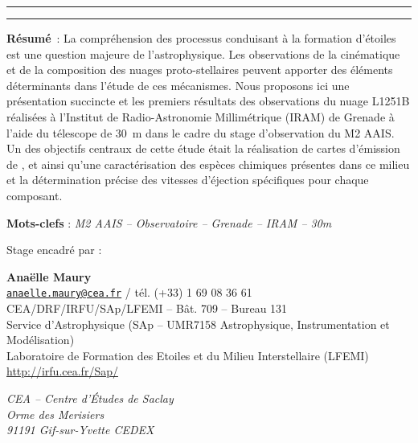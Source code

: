 \documentclass[a4paper,10pt,french]{article}
\begin{document}
\begin{center}

    \vspace{1.5cm}

    \rule[11pt]{5cm}{0.5pt}

    \textbf{\huge \thetitle}

    \rule{5cm}{0.5pt}

    \vspace{1.5cm}

    \parbox{15cm}{\textbf{Résumé} :
        La compréhension des processus conduisant à la formation d’étoiles est
        une question majeure de l’astrophysique. Les observations de la
        cinématique et de la composition des nuages proto-stellaires peuvent
        apporter des éléments déterminants dans l’étude de ces mécanismes. Nous
        proposons ici une présentation succincte et les premiers résultats des
        observations du nuage L1251B réalisées à l’Institut de Radio-Astronomie
        Millimétrique (IRAM) de Grenade à l’aide du télescope de
        \SI{30}{\meter} dans le cadre du stage d’observation du M2 AAIS. Un des
        objectifs centraux de cette étude était la réalisation de cartes
        d’émission de ,  et  ainsi qu’une
        caractérisation des espèces chimiques présentes dans ce milieu et la
        détermination précise des vitesses d’éjection spécifiques pour chaque
        composant.
    }

    \vspace{0.5cm}

    \parbox{15cm}{
        \textbf{Mots-clefs} : \it M2 AAIS – Observatoire – Grenade – IRAM – 30m
    }

    \vspace{0.5cm}

    \parbox{15cm}{
        Stage encadré par :

        \textbf{Anaëlle Maury} \\
        \href{mailto:anaelle.maury@cea.fr}{\tt anaelle.maury@cea.fr} / tél. (+33) 1 69 08 36 61 \\
        CEA/DRF/IRFU/SAp/LFEMI – Bât. 709 – Bureau 131 \\
        Service d’Astrophysique (SAp – UMR7158 Astrophysique, Instrumentation et Modélisation) \\
        Laboratoire de Formation des Etoiles et du Milieu Interstellaire (LFEMI) \\
        \url{http://irfu.cea.fr/Sap/}

        \textit{%
            CEA – Centre d’Études de Saclay \\
            Orme des Merisiers \\
            91191 Gif-sur-Yvette CEDEX
        }
    }


\end{center}
\end{document}
